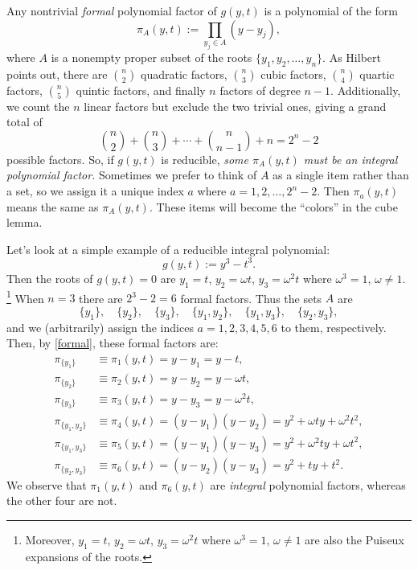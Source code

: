 \documentclass{article}
\theoremstyle{plain}
\theoremstyle{definition}
\begin{document}
Any nontrivial \emph{formal} polynomial factor of $g(y,t)$ is a polynomial of the
form
\begin{equation}
\label{formal} %
\pi_A(y,t) := \prod_{y_j\in A} (y - y_j),
\end{equation} 
where $A$ is a nonempty proper subset of the roots $\{y_1,y_2,\ldots,y_n\}$. As
Hilbert points out, there are $\binom{n}{2}$ quadratic factors,
$\binom{n}{3}$ cubic factors, $\binom{n}{4}$ quartic factors,
$\binom{n}{5}$ quintic factors, 
and finally
$n$
factors of degree $n-1$. Additionally, we count the
$n$ linear factors but exclude the two trivial ones, giving a grand total of
\[
\binom{n}{2} + \binom{n}{3} +\cdots+ \binom{n}{n-1} + n = 2^n - 2
\]
possible factors.
So, if $g(y,t)$ is reducible, \emph{some
$\pi_A(y,t)$ must be an integral polynomial factor.} 
%
Sometimes we prefer to think of $A$ as a single item rather than a set, so we assign it a unique index $a$ where $a = 1,2,\dots, 2^n - 2$. Then
$\pi_a(y,t)$ means the same as $\pi_A(y,t)$.  
These items will become the ``colors'' in the cube lemma.

Let's look at a simple example of a reducible integral polynomial:
\[
g(y,t) := y^3 - t^3.
\]
Then the roots of $g(y,t) = 0$ are $y_1 = t$, $y_2 = \omega t$,
$y_3 = \omega^2 t$ where $\omega^3 = 1$, $\omega \neq 1$.%
% 
\footnote{Moreover, $y_1 = t$, $y_2 = \omega t$, $y_3 = \omega^2 t$
where $\omega^3 = 1$, $\omega \neq 1$ are also the Puiseux expansions
of the roots.} 
% 
When $n = 3$ there are $2^3-2 = 6$ formal factors. Thus the sets $A$
are
\[
\{y_1\}, \quad \{y_2\}, \quad \{y_3\}, \quad 
\{y_1,y_2\}, \quad \{y_1,y_3\}, \quad \{y_2,y_3\},
\]
and we (arbitrarily) assign the indices $a = 1,2,3,4,5,6$ to them,
respectively. Then, by \eqref{formal}, these formal factors are:
\begin{align*}
\pi_{\{y_1\}} &\equiv \pi_1(y,t) = y - y_1 = y - t,
\\
\pi_{\{y_2\}} &\equiv \pi_2(y,t) = y - y_2 = y - \omega t,
\\
\pi_{\{y_3\}} &\equiv \pi_3(y,t) = y - y_3 = y - \omega^2 t,
\\
\pi_{\{y_1,y_2\}} &\equiv \pi_4(y,t) = (y - y_1)(y - y_2) 
= y^2 + \omega ty + \omega^2 t^2,
\\ 
\pi_{\{y_1,y_3\}} &\equiv \pi_5(y,t) = (y - y_1)(y - y_3) 
= y^2 + \omega^2 ty + \omega t^2,
\\ 
\pi_{\{y_2,y_3\}} 
&\equiv \pi_6(y,t) = (y - y_2)(y - y_3) = y^2 +  ty +  t^2.
\end{align*}
We observe that $\pi_1(y,t)$ and $\pi_6(y,t)$ are \emph{integral}
polynomial factors, whereas the other four are not.
\end{document}
